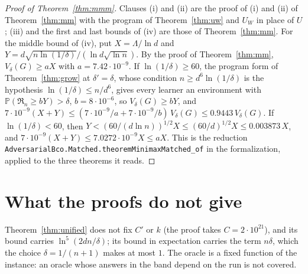 \documentclass[11pt]{amsart}
\theoremstyle{definition}
\numberwithin{equation}{section}
\newcommand{\Prob}{\mathbb{P}}
\newcommand{\Reg}{\mathfrak{R}}
\begin{document}
\begin{proof}[Proof of Theorem~\ref{thm:mmm}]
Clauses (i) and (ii) are the proof of (i) and (ii) of Theorem~\ref{thm:mm} with the program of Theorem~\ref{thm:uw} and $U_W$ in place of $U$; (iii) and the first and last bounds of (iv) are those of Theorem~\ref{thm:mm}. For the middle bound of (iv), put $X=\Lambda/\ln d$ and $Y=d\sqrt{n\ln(1/\delta)}/(\ln d\sqrt{\ln n})$. By the proof of Theorem~\ref{thm:mm}, $V_\delta(G)\ge aX$ with $a=7.42\cdot10^{-9}$. If $\ln(1/\delta)\ge60$, the program form of Theorem~\ref{thm:grow} at $\delta'=\delta$, whose condition $n\ge d^6\ln(1/\delta)$ is the hypothesis $\ln(1/\delta)\le n/d^6$, gives every learner an environment with $\Prob(\Reg_n\ge bY)>\delta$, $b=8\cdot10^{-6}$, so $V_\delta(G)\ge bY$, and $7\cdot10^{-9}(X+Y)\le(7\cdot10^{-9}/a+7\cdot10^{-9}/b)\,V_\delta(G)\le0.9443\,V_\delta(G)$. If $\ln(1/\delta)<60$, then $Y<(60/(d\ln n))^{1/2}X\le(60/d)^{1/2}X\le0.003873\,X$, and $7\cdot10^{-9}(X+Y)\le7.0272\cdot10^{-9}X\le aX$.
This is the reduction \texttt{AdversarialBco.\allowbreak Matched.\allowbreak theoremMinimaxMatched\_of} in the formalization, applied to the three theorems it reads.
\end{proof}

\section{What the proofs do not give}\label{sec:limits}

Theorem~\ref{thm:unified} does not fix $C'$ or $k$ (the proof takes $C=2\cdot10^{21}$), and its bound carries $\ln^5(2dn/\delta)$; its bound in expectation carries the term $n\delta$, which the choice $\delta=1/(n+1)$ makes at most $1$. The oracle is a fixed function of the instance: an oracle whose answers in the band depend on the run is not covered.
\end{document}
